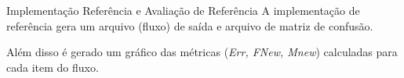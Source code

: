 \documentclass[aspectratio=43,10pt]{beamer}
\begin{document}






\begin{frame}[fragile]{Implementação Referência e Avaliação de Referência}
  A implementação de referência gera um arquivo (fluxo) de saída e arquivo de
  matriz de confusão.

  Além disso é gerado um gráfico das métricas (\textit{Err, FNew, Mnew}) calculadas para cada item do fluxo.
\end{frame}
\end{document}
